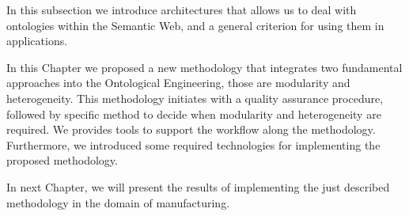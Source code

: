 In this subsection we introduce architectures that allows us to deal with ontologies within the Semantic Web, and a general criterion  for using them in applications. 









In this Chapter we proposed a new methodology that integrates two fundamental approaches into the Ontological Engineering, those are modularity and heterogeneity. This methodology initiates with a quality assurance procedure, followed by specific method to decide when modularity and heterogeneity are required. We provides tools to support the workflow along the methodology. Furthermore,  we introduced some required technologies for implementing the proposed methodology. 

In next Chapter, we will present the results of implementing the just described methodology in the domain of manufacturing.